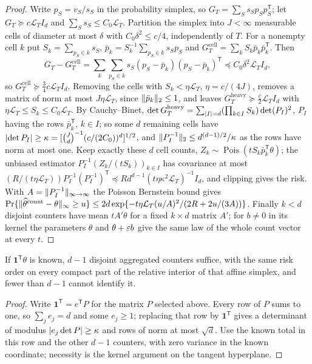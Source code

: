 \begin{proof}
Write $p_S=v_S/s_S$ in the probability simplex, so $G_T=\sum_Ss_Sp_Sp_S^{\mathsf T}$; let $G_T\succeq c\mathcal L_TI_d$ and
$\sum_Ss_S\le C_0\mathcal L_T$. Partition the simplex into $J<\infty$ measurable cells of diameter at most $\delta$ with
$C_0\delta^2\le c/4$, independently of $T$. For a nonempty cell $k$ put $S_k=\sum_{p_S\in k}s_S$,
$\bar p_k=S_k^{-1}\sum_{p_S\in k}s_Sp_S$ and $G_T^{\mathrm{cell}}=\sum_kS_k\bar p_k\bar p_k^{\mathsf T}$. Then
\[
 G_T-G_T^{\mathrm{cell}}=\sum_k\sum_{p_S\in k}s_S(p_S-\bar p_k)(p_S-\bar p_k)^{\mathsf T}\preceq C_0\delta^2\mathcal L_TI_d,
\]
so $G_T^{\mathrm{cell}}\succeq\tfrac34c\mathcal L_TI_d$. Removing the cells with $S_k<\eta\mathcal L_T$, $\eta=c/(4J)$, removes a matrix of
norm at most $J\eta\mathcal L_T$, since $\lVert\bar p_k\rVert_2\le1$, and leaves $G_T^{\mathrm{heavy}}\succeq\tfrac c2\mathcal L_TI_d$ with
$\eta\mathcal L_T\le S_k\le C_0\mathcal L_T$. By Cauchy--Binet, $\det G_T^{\mathrm{heavy}}=\sum_{\lvert I\rvert=d}(\prod_{k\in I}S_k)\det(P_I)^2$, $P_I$ having the
rows $\bar p_k^{\mathsf T}$, $k\in I$; so some $d$ remaining cells have
$\lvert\det P_I\rvert\ge\kappa=[\binom Jd^{-1}(c/(2C_0))^d]^{1/2}$, and $\lVert P_I^{-1}\rVert_2\le d^{(d-1)/2}/\kappa$ as the rows have norm at
most one. Keep exactly these $d$ cell counts, $Z_k\sim\operatorname{Pois}(tS_k\bar p_k^{\mathsf T}\theta)$; the unbiased estimator
$P_I^{-1}(Z_k/(tS_k))_{k\in I}$ has covariance at most $(R/(t\eta\mathcal L_T))P_I^{-1}(P_I^{-1})^{\mathsf T}\preceq
Rd^{d-1}(t\eta\kappa^2\mathcal L_T)^{-1}I_d$, and clipping gives the risk. With $A=\lVert P_I^{-1}\rVert_{\infty\to\infty}$ the Poisson Bernstein
bound gives $\Pr\{\lVert\widehat\theta^{\mathrm{count}}-\theta\rVert_\infty\ge u\}\le2d\exp\{-t\eta\mathcal L_T(u/A)^2/(2R+2u/(3A))\}$. Finally $k<d$
disjoint counters have mean $tA'\theta$ for a fixed $k\times d$ matrix $A'$; for $b\ne0$ in its kernel the parameters $\theta$
and $\theta+\varepsilon b$ give the same law of the whole count vector at every $t$.
\end{proof}

\begin{corollary}\label{chz:cor:knowntotal}
If $\mathbf 1^{\mathsf T}\theta$ is known, $d-1$ disjoint aggregated counters suffice, with the same risk order on every compact
part of the relative interior of that affine simplex, and fewer than $d-1$ cannot identify it.
\end{corollary}

\begin{proof}
Write $\mathbf 1^{\mathsf T}=e^{\mathsf T}P$ for the matrix $P$ selected above. Every row of $P$ sums to one, so $\sum_je_j=d$ and some
$e_j\ge1$; replacing that row by $\mathbf 1^{\mathsf T}$ gives a determinant of modulus $\lvert e_j\det P\rvert\ge\kappa$ and rows of norm at
most $\sqrt d$. Use the known total in this row and the other $d-1$ counters, with zero variance in the known
coordinate; necessity is the kernel argument on the tangent hyperplane.
\end{proof}

